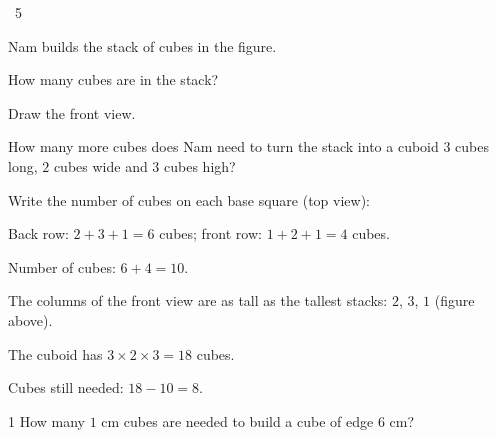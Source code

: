 \begin{exbox}{\ExWord\ 5}
\begin{minipage}[t]{0.58\linewidth}
Nam builds the stack of cubes in the figure.\par
{} How many cubes are in the stack?\par
{} Draw the front view.\par
{} How many more cubes does Nam need to turn the stack into a cuboid $3$ cubes long, $2$ cubes wide and $3$ cubes high?
\end{minipage}\hfill
\begin{minipage}[t]{0.38\linewidth}\vspace{0pt}\centering
{}
\end{minipage}
\guide
{} Write the number of cubes on each base square (top view):\par
\begin{center}\qquad
{}\end{center}
Back row: $2+3+1=6$ cubes; front row: $1+2+1=4$ cubes.\par
Number of cubes: $6+4=10$.\par
{} The columns of the front view are as tall as the tallest stacks: $2$, $3$, $1$ (figure above).\par
{} The cuboid has $3\times2\times3=18$ cubes.\par
Cubes still needed: $18-10=8$.
\end{exbox}
\begin{probbox}{1}{\relax}
How many $1$ cm cubes are needed to build a cube of edge $6$ cm?
\end{probbox}
